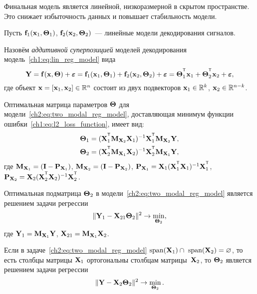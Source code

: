\documentclass[11pt, a5paper]{dissert}
\begin{document}
Финальная модель является линейной, низкоразмерной в скрытом пространстве. 
Это снижает избыточность данных и повышает стабильность модели.

Пусть $\mathbf{f}_1(\mathbf{x}_1, \boldsymbol{\Theta}_1)$, $\mathbf{f}_2(\mathbf{x}_2, \boldsymbol{\Theta}_2)$~--- линейные модели декодирования сигналов. 
\begin{definition}
	Назовём \textit{аддитивной суперпозицией} моделей декодирования модель~\eqref{ch1:eq:lin_reg_model} вида
	\begin{equation}
		\bY = \mathbf{f}(\bx, \bTheta) + \bepsilon = \mathbf{f}_1(\bx_1, \bTheta_1) + \mathbf{f}_2(\bx_2, \bTheta_2) + \bepsilon = \bTheta_1^{\T} \bx_1 + \bTheta_2^{\T} \bx_2 + \bepsilon,
		\label{ch2:eq:two_modal_reg_model}
	\end{equation}
	где объект $\mathbf{x} = [\mathbf{x}_1, \mathbf{x}_2] \in \mathbb{R}^n$ состоит из двух подвекторов $\mathbf{x}_1 \in \mathbb{R}^k$, $\mathbf{x}_2 \in \mathbb{R}^{n - k}$. 
\end{definition}

\begin{statement}
	\label{ch2:stat:two_modal_params}
	Оптимальная матрица параметров $\boldsymbol{\Theta}$ для модели~\eqref{ch2:eq:two_modal_reg_model}, доставляющая минимум функции ошибки~\eqref{ch1:eq:l2_loss_function}, имеет вид:
	\begin{align*}
		\bTheta_1 &= (\bX_1^{\T} \bM_{\bX_2} \bX_1)^{-1} \bX_1^{\T} \bM_{\bX_2} \bY, \\
		\bTheta_2 &= (\bX_2^{\T} \bM_{\bX_1} \bX_2)^{-1} \bX_2^{\T} \bM_{\bX_1} \bY,
	\end{align*}
	где $\mathbf{M}_{\mathbf{X}_1} = (\mathbf{I} - \mathbf{P}_{\mathbf{X}_1})$, $\mathbf{M}_{\mathbf{X}_2} = (\mathbf{I} - \mathbf{P}_{\mathbf{X}_2})$, $\bP_{\bX_1} = \bX_1 (\bX_1^{\T} \bX_1)^{-1} \bX_1^{\T}$, $\bP_{\bX_2} = \bX_2 (\bX_2^{\T} \bX_2)^{-1} \bX_2^{\T}$.
\end{statement}

\begin{statement}
	\label{ch2:stat:two_modal_theta2}
	Оптимальная подматрица $\boldsymbol{\Theta}_2$ в модели~\eqref{ch2:eq:two_modal_reg_model} является решением задачи регрессии
	\begin{equation}
		\| \mathbf{Y}_1 -  \mathbf{X}_{21} \boldsymbol{\Theta}_2 \|^2 \rightarrow \min_{\boldsymbol{\Theta}_2},
		\label{ch2:eq:two_modal_fwl}
	\end{equation}
	где $\mathbf{Y}_1 = \mathbf{M}_{\mathbf{X}_1} \mathbf{Y}$, $\mathbf{X}_{21} = \mathbf{M}_{\mathbf{X}_1} \mathbf{X}_2$.
\end{statement}

\begin{statement}
	Если в задаче~\eqref{ch2:eq:two_modal_reg_model} $\text{span}(\mathbf{X}_1) \cap \text{ span}(\mathbf{X}_2) = \varnothing$, то есть столбцы матрицы $\mathbf{X}_1$ ортогональны столбцам матрицы~$\mathbf{X}_2$, то $\boldsymbol{\Theta}_2$ является решением задачи регрессии
	\[
		\| \mathbf{Y} -  \mathbf{X}_{2} \boldsymbol{\Theta}_2 \|^2 \rightarrow \min_{\boldsymbol{\Theta}_2}.
	\]
\end{statement}
\end{document}
